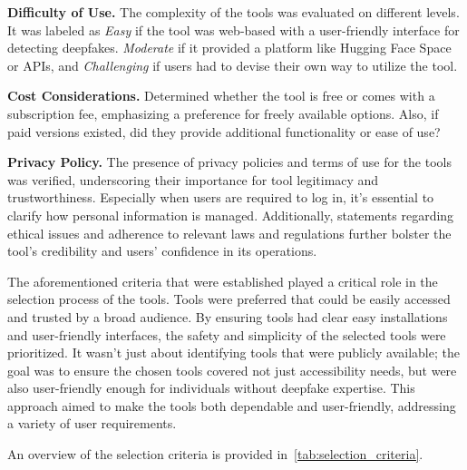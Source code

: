 \textbf{Difficulty of Use.} The complexity of the tools was evaluated on different levels.
It was labeled as \textit{Easy} if the tool was web-based with a user-friendly
interface for detecting deepfakes. \textit{Moderate} if it provided a platform like
Hugging Face Space or \ac{API}s, and \textit{Challenging} if users had to devise their
own way to utilize the tool.

\textbf{Cost Considerations.} Determined whether the tool is free or comes with a
subscription fee, emphasizing a preference for freely available options. Also, if
paid versions existed, did they provide additional functionality or ease of use?

\textbf{Privacy Policy.} The presence of privacy policies and terms of use for the
tools was verified, underscoring their importance for tool legitimacy and
trustworthiness. Especially when users are required to log in, it's essential
to clarify how personal information is managed. Additionally, statements regarding
ethical issues and adherence to relevant laws and regulations further bolster the
tool's credibility and users' confidence in its operations.

The aforementioned criteria that were established played a critical role in the
selection process of the tools. Tools were preferred that could be easily
accessed and trusted by a broad audience. By ensuring tools had clear easy
installations and user-friendly interfaces, the safety and simplicity of the
selected tools were prioritized. It wasn't just about identifying tools that were
publicly available; the goal was to ensure the chosen tools covered not just
accessibility needs, but were also user-friendly enough for individuals without
deepfake expertise. This approach aimed to make the tools both dependable and
user-friendly, addressing a variety of user requirements.

An overview of the  selection criteria is provided in~\autoref{tab:selection_criteria}.

